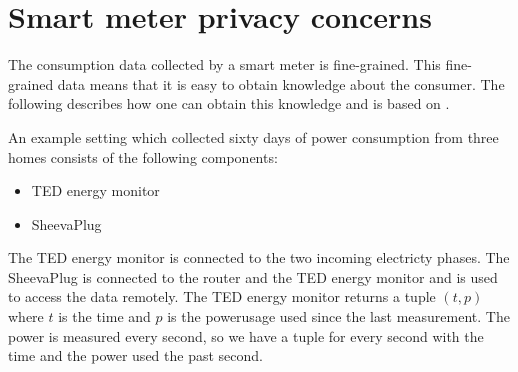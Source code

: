 \section{Smart meter privacy concerns}
The consumption data collected by a smart meter is fine-grained.
This fine-grained data means that it is easy to obtain knowledge about the consumer.
The following describes how one can obtain this knowledge and is based on \citet{privacy_memoir}.


An example setting which collected sixty days of power consumption from three homes consists of the following components:
\begin{itemize}
\item TED energy monitor
\item SheevaPlug
\end{itemize}
The TED energy monitor is connected to the two incoming electricty phases.
The SheevaPlug is connected to the router and the TED energy monitor and is used to access the data remotely.
The TED energy monitor returns a tuple $(t,p)$ where $t$ is the time and $p$ is the powerusage used since the last measurement.
The power is measured every second, so we have a tuple for every second with the time and the power used the past second.
